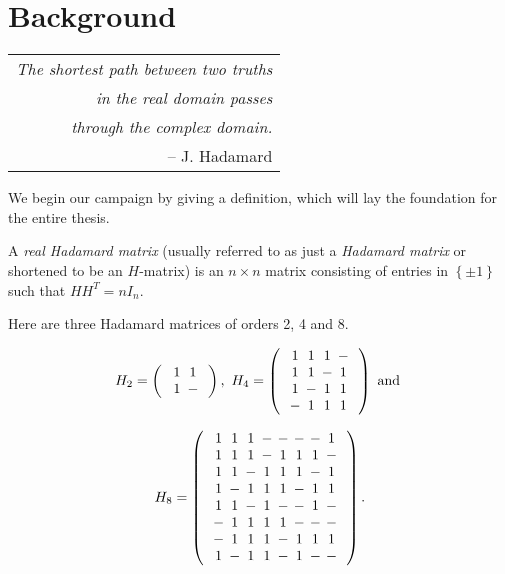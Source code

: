 \chapter[Background]{Background}
\label{ch:background}

\hfill\begin{tabular}{r}\toprule
 {\it The shortest path between two truths} \\ {\it in the real domain passes} \\ {\it through the complex domain.} \\
  -- J. Hadamard\\
\bottomrule\end{tabular}\vskip25pt

We begin our campaign by giving a definition, which will lay the foundation for the entire thesis.

\begin{definition} \label{def:hadamard}
 A {\it real Hadamard matrix} (usually referred to as just a {\it Hadamard matrix} or shortened to be an $H$-matrix) is an $n \times n$ matrix consisting of entries in $\left\{ \pm 1 \right\}$ such that $HH^T = nI_n$.
\end{definition}

\begin{example} \label{ex:hadamard}

Here are three Hadamard matrices of orders 2, 4 and 8.

 $$H_2 = \left(\begin{array}{c}
               \Zp\Zp \\
               \Zp\Zm
              \end{array}\right), ~
  H_4 = \left(\begin{array}{c}
               \Zp\Zp\Zp\Zm \\
               \Zp\Zp\Zm\Zp \\
               \Zp\Zm\Zp\Zp \\
               \Zm\Zp\Zp\Zp
              \end{array}\right) \text{ and }$$

$$H_8 = \left(\begin{array}{c}
               \Zp\Zp\Zp\Zm\Zm\Zm\Zm\Zp \\
               \Zp\Zp\Zp\Zm\Zp\Zp\Zp\Zm \\
               \Zp\Zp\Zm\Zp\Zp\Zp\Zm\Zp \\
               \Zp\Zm\Zp\Zp\Zp\Zm\Zp\Zp \\
               \Zp\Zp\Zm\Zp\Zm\Zm\Zp\Zm \\
               \Zm\Zp\Zp\Zp\Zp\Zm\Zm\Zm \\
               \Zm\Zp\Zp\Zp\Zm\Zp\Zp\Zp \\
               \Zp\Zm\Zp\Zp\Zm\Zp\Zm\Zm \\
              \end{array}\right).$$

\end{example}

